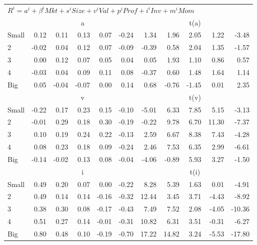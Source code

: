 \begin{table}[!ht]
\begin{tabular}{lrrrrrrrrrr}
  \midrule
  \multicolumn{11}{l}{$R^i=a^i+\beta^iMkt+s^iSize+v^iVal+p^iProf+i^iInv+m^iMom$}  \\
  
     & \multicolumn{5}{c}{a} & \multicolumn{5}{c}{t(a)}   \\
     \cmidrule(r){2-6} \cmidrule(r){7-11} 
    Small  & 0.12  & 0.11  & 0.13  & 0.07  & -0.24  & 1.34  & 1.96  & 2.05  & 1.22  & -3.48   \\
    2  & -0.02  & 0.04  & 0.12  & 0.07  & -0.09  & -0.39  & 0.58  & 2.04  & 1.35  & -1.57   \\
    3  & 0.00  & 0.12  & 0.07  & 0.05  & 0.04  & 0.05  & 1.93  & 1.10  & 0.86  & 0.57   \\
    4  & -0.03  & 0.04  & 0.09  & 0.11  & 0.08  & -0.37  & 0.60  & 1.48  & 1.64  & 1.14   \\
    Big  & 0.05  & -0.04  & -0.07  & 0.00  & 0.14  & 0.68  & -0.76  & -1.45  & 0.01  & 2.35   \\

     & \multicolumn{5}{c}{v} & \multicolumn{5}{c}{t(v)}   \\
     \cmidrule(r){2-6} \cmidrule(r){7-11} 
    Small  & -0.22  & 0.17  & 0.23  & 0.15  & -0.10  & -5.01  & 6.33  & 7.85  & 5.15  & -3.13   \\
    2  & -0.01  & 0.29  & 0.18  & 0.30  & -0.19  & -0.22  & 9.78  & 6.70  & 11.30  & -7.37   \\
    3  & 0.10  & 0.19  & 0.24  & 0.22  & -0.13  & 2.59  & 6.67  & 8.38  & 7.43  & -4.28   \\
    4  & 0.08  & 0.23  & 0.18  & 0.09  & -0.24  & 2.46  & 7.53  & 6.35  & 2.99  & -6.61   \\
    Big  & -0.14  & -0.02  & 0.13  & 0.08  & -0.04  & -4.06  & -0.89  & 5.93  & 3.27  & -1.50   \\

     & \multicolumn{5}{c}{i} & \multicolumn{5}{c}{t(i)}   \\
     \cmidrule(r){2-6} \cmidrule(r){7-11} 
    Small  & 0.49  & 0.20  & 0.07  & 0.00  & -0.22  & 8.28  & 5.39  & 1.63  & 0.01  & -4.91   \\
    2  & 0.49  & 0.14  & 0.14  & -0.16  & -0.32  & 12.44  & 3.45  & 3.71  & -4.43  & -8.92   \\
    3  & 0.38  & 0.30  & 0.08  & -0.17  & -0.43  & 7.49  & 7.52  & 2.08  & -4.05  & -10.36   \\
    4  & 0.51  & 0.27  & 0.14  & -0.01  & -0.31  & 10.82  & 6.31  & 3.51  & -0.31  & -6.27   \\
    Big  & 0.80  & 0.48  & 0.10  & -0.19  & -0.70  & 17.22  & 14.82  & 3.24  & -5.53  & -17.80   \\

  \bottomrule
\end{tabular}
\label{tbl:25_Size_Inv_B16}
\end{table}